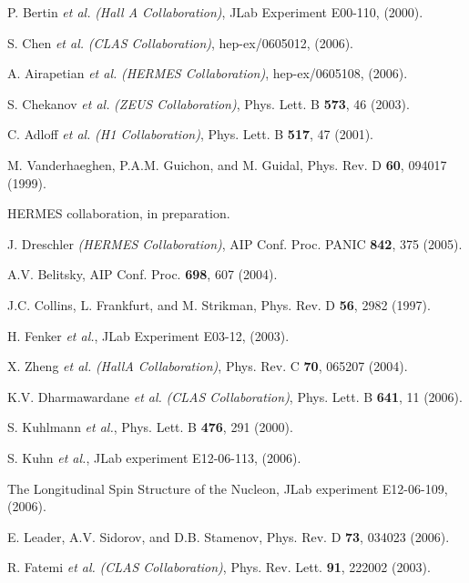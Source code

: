 \begin{thebibliography}{199}
P. Bertin {\it et al.} {\it (Hall A Collaboration)}, JLab Experiment E00-110,
(2000).

S. Chen {\it et al.} {\it (CLAS Collaboration)}, hep-ex/0605012, (2006).

A. Airapetian {\it et al.} {\it (HERMES Collaboration)}, hep-ex/0605108,
(2006).

S. Chekanov {\it et al.} {\it (ZEUS Collaboration)}, Phys. Lett. B {\bf 573},
46 (2003).

C. Adloff {\it et al.} {\it (H1 Collaboration)}, Phys. Lett. B {\bf 517},
47 (2001).

M. Vanderhaeghen, P.A.M. Guichon, and M. Guidal, Phys. Rev. D {\bf 60},
094017 (1999).

HERMES collaboration, in preparation.

J. Dreschler {\it (HERMES Collaboration)}, AIP Conf. Proc. PANIC 
{\bf 842}, 375 (2005).

A.V. Belitsky, AIP Conf. Proc. {\bf 698}, 607 (2004).

J.C. Collins, L. Frankfurt, and M. Strikman, Phys. Rev. D {\bf 56},
2982 (1997).


H. Fenker {\it et al.}, JLab Experiment E03-12, (2003).

X. Zheng {\it et al.} {\it (HallA Collaboration)}, Phys. Rev. C {\bf 70},
065207 (2004).

K.V. Dharmawardane {\it et al.} {\it (CLAS Collaboration)},
Phys. Lett. B {\bf 641}, 11 (2006).

S. Kuhlmann {\it et al.}, Phys. Lett. B {\bf 476}, 291 (2000).

S. Kuhn {\it et al.}, JLab experiment E12-06-113, (2006).

The Longitudinal Spin Structure of the Nucleon, JLab experiment E12-06-109,
(2006).

E. Leader, A.V. Sidorov, and D.B. Stamenov, Phys. Rev. D {\bf 73},
034023 (2006).

R. Fatemi {\it et al.} {\it (CLAS Collaboration)}, Phys. Rev. Lett. 
{\bf 91}, 222002 (2003).


\end{thebibliography}
